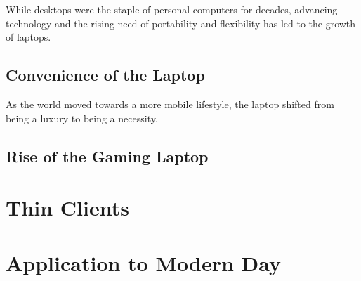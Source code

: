 While desktops were the staple of personal computers for decades, advancing technology and the rising need of portability and flexibility has led to the growth of laptops.


\subsection{Convenience of the Laptop}

As the world moved towards a more mobile lifestyle, the laptop shifted from being a luxury to being a necessity.


\todosection


\subsection{Rise of the Gaming Laptop}

\todosection


\section{Thin Clients}

\todosection


\section{Application to Modern Day}

\todosection